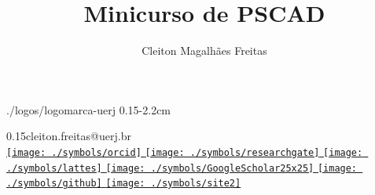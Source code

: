 \documentclass[12pt,aspectratio=169]{beamer}
\author[Cleiton Magalhães Freitas]{Cleiton Magalhães Freitas}
\title[Minicurso de PSCAD]
{Minicurso de PSCAD}
\date{}
\newcommand{\cmfnetwork}{
\href{https://orcid.org/0000-0002-6300-0521}
{
\texttt{[image: ./symbols/orcid]}
}\href{https://www.researchgate.net/profile/Cleiton_Freitas}
{
\texttt{[image: ./symbols/researchgate]}
}\href{http://lattes.cnpq.br/8580465355265899}
{
\texttt{[image: ./symbols/lattes]}
}\href{https://scholar.google.com/citations?user=Nq_YDvIAAAAJ&hl=pt-BR}
{
\texttt{[image: ./symbols/GoogleScholar25x25]}
}\href{https://www.mendeley.com/profiles/cleiton-freitas3/}
{
\texttt{[image: ./symbols/github]}
}\href{http://www.eng.uerj.br/prof/cleitoncmf}
{
\texttt{[image: ./symbols/site2]}
}
}
\begin{document}
\renewcommand{\inserttotalframenumber}{\pageref{lastframe}} %

					{./logos/logomarca-uerj}				                    {0.15\linewidth}{-2.2cm}
					
				                    {0.15\linewidth}{cleiton.freitas@uerj.br}{\\[5pt] \cmfnetwork}

\cmftableofcontents

%








%
%
%
%
%
%
%
%
%



%
%
%
%
\end{document}
